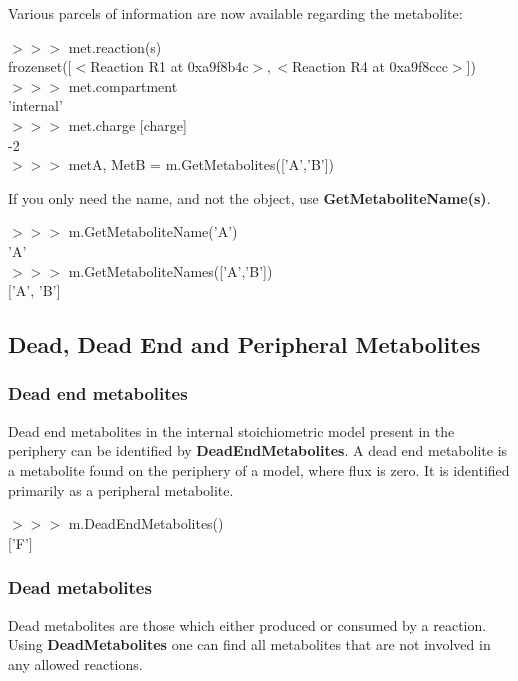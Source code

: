 Various parcels of information are now available regarding the metabolite:

\begin{framed}
$>>>$ met.reaction(s)\\
frozenset([$<$Reaction R1 at 0xa9f8b4c$>, <$Reaction R4 at 0xa9f8ccc$>$])\\

$>>>$ met.compartment\\
'internal'\\

$>>>$ met.charge [charge]\\
-2\\

$>>>$ metA, MetB = m.GetMetabolites(['A','B'])
\end{framed}

If you only need the name, and not the object, use \textbf{GetMetaboliteName(s)}.

\begin{framed}
$>>>$ m.GetMetaboliteName('A')\\
'A'\\

$>>>$ m.GetMetaboliteNames(['A','B'])\\
$[$'A', 'B'$]$
\end{framed}



\subsection{Dead, Dead End and Peripheral Metabolites}

\subsubsection{Dead end metabolites}
Dead end metabolites in the internal stoichiometric model present in the periphery can be identified by \textbf{DeadEndMetabolites}. A dead end metabolite is a metabolite found on the periphery of a model, where flux is zero. It is identified primarily as a peripheral metabolite.

\begin{framed}
$>>>$ m.DeadEndMetabolites()\\
$[$'F'$]$
\end{framed}


\subsubsection{Dead metabolites}
Dead metabolites are those which either produced or consumed by a reaction. Using \textbf{DeadMetabolites} one can find all metabolites that are not involved in any allowed reactions.

